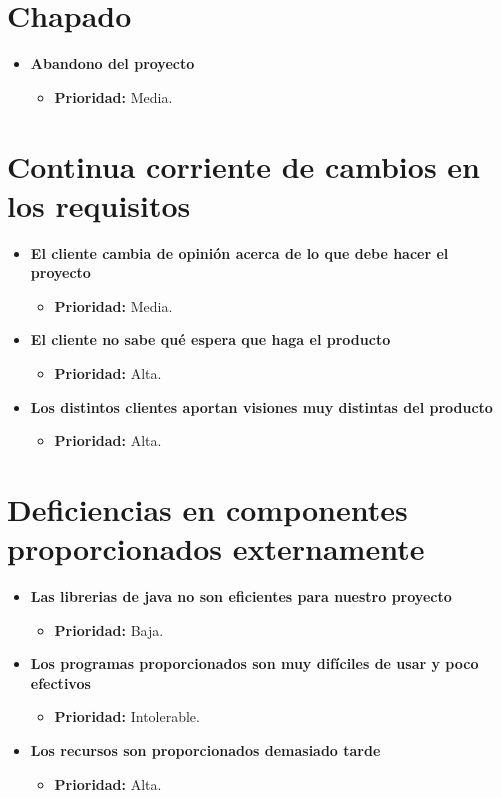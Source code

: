 \documentclass[spanish,a4paper,12pt]{report}	%
\begin{document}
\section{Chapado}
	\begin{itemize}
		\item \textbf{Abandono del proyecto}
			\begin{itemize}
				\item \textbf{Prioridad: }Media.			%
			\end{itemize}
	\end{itemize}
%
\section{Continua corriente de cambios en los requisitos}
	\begin{itemize}
		\item \textbf{El cliente cambia de opinión acerca de lo que debe hacer el proyecto}
			\begin{itemize}
				\item \textbf{Prioridad: }Media.
			\end{itemize}
		
		\item \textbf{El cliente no sabe qué espera que haga el producto}	%
			\begin{itemize}
				\item \textbf{Prioridad: }Alta.
			\end{itemize}
		
		\item \textbf{Los distintos clientes aportan visiones muy distintas del producto}	%
			\begin{itemize}
				\item \textbf{Prioridad: }Alta.
			\end{itemize}
	\end{itemize}
%
\section{Deficiencias en componentes proporcionados externamente}
	\begin{itemize}
		\item \textbf{Las librerias de java no son eficientes para nuestro proyecto}	
			\begin{itemize}
				\item \textbf{Prioridad: }Baja.
			\end{itemize}
		
		\item \textbf{Los programas proporcionados son muy difíciles de usar y poco efectivos}	
			\begin{itemize}
				\item \textbf{Prioridad: }Intolerable.
			\end{itemize}
		
		\item \textbf{Los recursos son proporcionados demasiado tarde}	%
			\begin{itemize}
				\item \textbf{Prioridad: }Alta.
			\end{itemize}
	\end{itemize}
%
\end{document}
